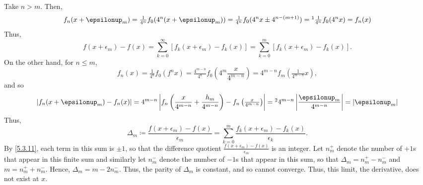 \begin{exm}
\begin{savenotes}
Take $n>m$.  Then,
\begin{equation}
f_n(x+\epsilon _m)=\tfrac{1}{4^n}f_0(4^n(x+\epsilon _m))=\tfrac{1}{4^n}f_0(4^nx\pm 4^{n-(m+1)})=\footnote{Because $f_0$ has period $1$ and $n\geq m+1$.}\tfrac{1}{4^n}f_0(4^nx)=f_n(x)
\end{equation}
Thus,
\begin{equation}
f(x+\epsilon _m)-f(x)=\sum _{k=0}^\infty [f_k(x+\epsilon _m)-f_k(x)]=\sum _{k=0}^m[f_k(x+\epsilon _m)-f_k(x)].
\end{equation}
On the other hand, for $n\leq m$,
\begin{equation}
f_n(x)=\tfrac{1}{4^n}f_0(f^nx)=\tfrac{4^{m-n}}{4^n}f_0\left( 4^m\frac{x}{4^{m-n}}\right) =4^{m-n}f_m(\tfrac{1}{4^{m-n}}x),
\end{equation}
and so
\begin{equation}\label{5.3.11}
\left| f_n(x+\epsilon _m)-f_n(x)\right| =4^{m-n}\left| f_n\left( \frac{x}{4^{m-n}}+\frac{h_m}{4^{m-n}}\right) -f_n\left( \tfrac{x}{4^{m-n}}\right) \right| =\footnote{Because, for $n\leq m$, $\abs{\frac{\epsilon _m}{4^{m-n}}}\leq \abs{\epsilon _m}$.}4^{m-n}\left| \frac{\epsilon _m}{4^{m-n}}\right|=\abs{\epsilon _m}
\end{equation}
Thus,
\begin{equation}
\Delta _m\coloneqq \frac{f(x+\epsilon _m)-f(x)}{\epsilon _m}=\sum _{k=0}^m\frac{f_k(x+\epsilon _m)-f_k(x)}{\epsilon _k}.
\end{equation}
By \eqref{5.3.11}, each term in this sum is $\pm 1$, so that the difference quotient $\frac{f(x+\epsilon _m)-f(x)}{\epsilon _m}$ is an integer.  Let $n_m^+$ denote the number of $+1$s that appear in this finite sum and similarly let $n_m^-$ denote the number of $-1$s that appear in this sum, so that $\Delta _m=n_m^+-n_m^-$ and $m=n_m^++n_m^-$.  Hence, $\Delta _m=m-2n_m^-$.  Thus, the parity of $\Delta _m$ is constant, and so cannot converge.  Thus, this limit, the derivative, does not exist at $x$.
\end{savenotes}
\end{exm}

